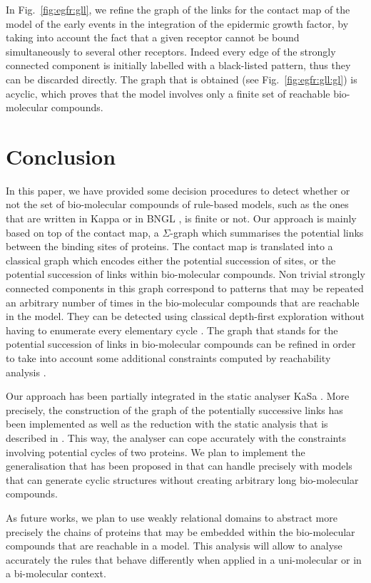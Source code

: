 \documentclass{entcs}
\begin{document}
\begin{exmp}
In Fig.~\ref{fig:egfr:gll}, we refine the graph of the links  for the contact map of the model of the early events in the integration of the epidermic growth factor, by taking into account the fact that a given receptor cannot be bound simultaneously to several other receptors.
Indeed every edge of the strongly connected component is initially labelled with a black-listed pattern, thus they can be discarded directly. The graph that is obtained (see Fig.~\ref{fig:egfr:gll:gl}) is acyclic, which proves that the model involves only a finite set of reachable bio-molecular compounds.
\end{exmp}


\label{sec:refinement}
\section{Conclusion}

In this paper, we have provided some decision procedures
to detect whether or not the set of bio-molecular compounds of rule-based models, such as the ones that are written in Kappa \cite{DBLP:journals/tcs/DanosL04} or in BNGL \cite{BNGL}, is finite or not.
Our approach is mainly based on top of the contact map, a $\Sigma$-graph which summarises the potential links between the binding sites of proteins. The contact map is translated into a classical graph which encodes either the potential succession of sites, or the potential succession of links within bio-molecular compounds.
Non trivial strongly connected components in this graph correspond to  patterns that may be repeated an arbitrary number of times in the bio-molecular compounds that are reachable in the model. They can be detected using classical depth-first exploration without having to enumerate every elementary cycle \cite{tarjan}.
The graph that stands for the potential succession of links in bio-molecular compounds can be refined in order to take into account some additional constraints  computed by reachability analysis \cite{DanosEtAl-VMCAI08,SASB2016,KaSa}.

Our approach has been partially integrated in the static analyser KaSa \cite{KaSa}. More precisely, the construction of the graph of the potentially
successive links has been implemented as well as the reduction with the static analysis that is described in \cite{SASB2016}. This way, the analyser can cope accurately with the constraints involving potential cycles of two proteins.  We plan to implement the generalisation that has been proposed in \cite{afp} that can handle precisely with models that can generate cyclic structures without creating arbitrary long bio-molecular compounds.

As future works, we plan to use weakly relational domains \cite{DBLP:conf/sas/Mine02} to abstract more precisely the chains of proteins that may be embedded within the bio-molecular compounds that are reachable in a model. This analysis will allow to analyse accurately the rules that behave differently when applied in a uni-molecular or in a bi-molecular context.



\end{document}
